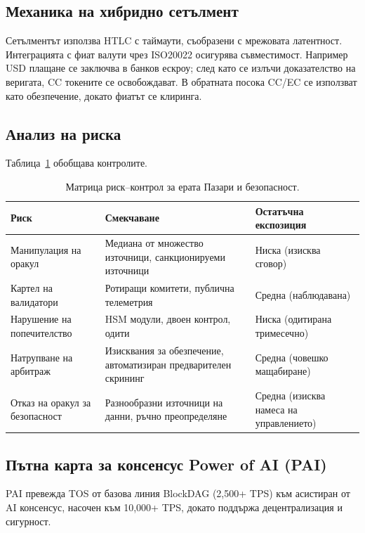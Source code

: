 \documentclass[11pt]{article}
\begin{document}
\subsection{Механика на хибридно сетълмент}
Сетълментът използва HTLC с таймаути, съобразени с мрежовата латентност. Интеграцията с фиат валути чрез ISO20022 осигурява съвместимост. Например USD плащане се заключва в банков ескроу; след като се излъчи доказателство на веригата, CC токените се освобождават. В обратната посока CC/EC се използват като обезпечение, докато фиатът се клиринга.

\subsection{Анализ на риска}
Таблица~\ref{tab:risk-markets} обобщава контролите.

\begin{table}[H]
  \centering
  \begin{tabular}{p{}p{}p{}}
    \toprule
    \textbf{Риск} & \textbf{Смекчаване} & \textbf{Остатъчна експозиция} \\
    \midrule
    Манипулация на оракул & Медиана от множество източници, санкционируеми източници & Ниска (изисква сговор) \\
    Картел на валидатори & Ротиращи комитети, публична телеметрия & Средна (наблюдавана) \\
    Нарушение на попечителство & HSM модули, двоен контрол, одити & Ниска (одитирана тримесечно) \\
    Натрупване на арбитраж & Изисквания за обезпечение, автоматизиран предварителен скрининг & Средна (човешко мащабиране) \\
    Отказ на оракул за безопасност & Разнообразни източници на данни, ръчно преопределяне & Средна (изисква намеса на управлението) \\
    \bottomrule
  \end{tabular}
  \caption{Матрица риск--контрол за ерата Пазари и безопасност.}
  \label{tab:risk-markets}
\end{table}

\subsection{Пътна карта за консенсус Power of AI (PAI)}
\label{sec:pai-roadmap}
PAI превежда TOS от базова линия BlockDAG (2,500+ TPS) към асистиран от AI консенсус, насочен към 10,000+ TPS, докато поддържа децентрализация и сигурност.
\end{document}
